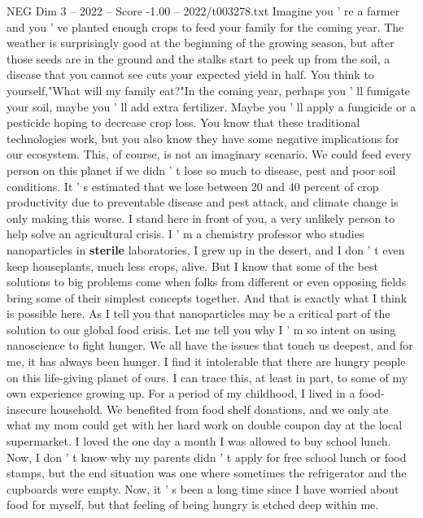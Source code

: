 \begin{textsample}{NEG Dim 3 – 2022 – Score -1.00 – 2022/t003278.txt}  \label{ex:f3_neg_061}
Imagine you ' re a farmer and you ' ve planted enough crops to feed your family for the coming year.
The weather is surprisingly good at the beginning of the growing season, but after those seeds are in the ground and the stalks start to peek up from the soil, a disease that you cannot see cuts your expected yield in half.
You think to yourself,"What will my family eat?"In the coming year, perhaps you ' ll fumigate your soil, maybe you ' ll add extra fertilizer.
Maybe you ' ll apply a fungicide or a pesticide hoping to decrease crop loss.
You know that these traditional technologies work, but you also know they have some negative implications for our ecosystem.
This, of course, is not an imaginary scenario.
We could feed every person on this planet if we didn ' t lose so much to disease, pest and poor soil conditions.
It ' s estimated that we lose between 20 and 40 percent of crop productivity due to preventable disease and pest attack, and climate change is only making this worse.
I stand here in front of you, a very unlikely person to help solve an agricultural crisis.
I ' m a chemistry professor who studies nanoparticles in \textbf{sterile} laboratories, I grew up in the desert, and I don ' t even keep houseplants, much less crops, alive.
But I know that some of the best solutions to big problems come when folks from different or even opposing fields bring some of their simplest concepts together.
And that is exactly what I think is possible here.
As I tell you that nanoparticles may be a critical part of the solution to our global food crisis.
Let me tell you why I ' m so intent on using nanoscience to fight hunger.
We all have the issues that touch us deepest, and for me, it has always been hunger.
I find it intolerable that there are hungry people on this life-giving planet of ours.
I can trace this, at least in part, to some of my own experience growing up.
For a period of my childhood, I lived in a food-insecure household.
We benefited from food shelf donations, and we only ate what my mom could get with her hard work on double coupon day at the local supermarket.
I loved the one day a month I was allowed to buy school lunch.
Now, I don ' t know why my parents didn ' t apply for free school lunch or food stamps, but the end situation was one where sometimes the refrigerator and the cupboards were empty.
Now, it ' s been a long time since I have worried about food for myself, but that feeling of being hungry is etched deep within me.

\end{textsample}
